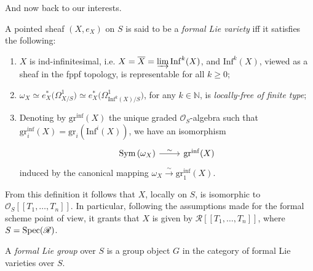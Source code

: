 \noindent
And now back to our interests.
\begin{defn}\label{defn:FormalLieVarfppf}
	A pointed sheaf $\left(X, e_X\right)$ on $S$ is said to be
	a \emph{formal Lie variety} iff it satisfies the following:
\begin{enumerate}
	\item $X$ is ind-infinitesimal,
		i.e$.$ \(X = \overline{X} = \varinjlim \operatorname{Inf}^k(X)\),
		and $\mathrm{Inf}^k(X)$, viewed as a sheaf in
		the fppf topology, is representable for all $k \geq 0$;

	\item $\omega_X \simeq
		e_X^* \big( \Omega_{X/S}^1 \big)
		\simeq e_X^* \big( \Omega^1_{\mathrm{Inf}^k(X)/S} \big)$, for any $k \in \mathbb{N}$,
		is \emph{locally-free of finite type};

	\item Denoting by $\mathrm{gr}^{\mathrm{inf}}(X)$ the unique graded $\mathcal{O}_{ S }$-algebra
		such that $\mathrm{gr}^{\mathrm{inf}}_i(X) = \mathrm{gr}_i(\mathrm{Inf}^i(X))$,
		we have an isomorphism
		\begin{equation*}
		\begin{tikzcd}[row sep = 0ex
			,/tikz/column 1/.append style={anchor=base east}
			,/tikz/column 2/.append style={anchor=base west}]
		\sym\left( \omega_X \right) \arrow[r, "\sim", rightarrow] &
				\mathrm{gr}^{\mathrm{inf}}(X)
		\end{tikzcd}
		\end{equation*}
		induced by the canonical mapping
		$\omega_X \xrightarrow{\sim} \mathrm{gr}_1^{\mathrm{inf}}(X)$.
\end{enumerate}
\end{defn}


\begin{rem}\label{rem:FormalLieVarietyPowerSeries}
	From this definition it follows that $X$, locally on $S$,
	is isomorphic to $\mathcal{O}_S [\![ T_1, \ldots, T_n ]\!]$.
	In particular, following the assumptions made for the formal scheme point of view,
	it grants that $X$ is given by
	$\mathscr{R} [\![ T_1, \ldots, T_n ]\!]$,
	where $S = \operatorname{Spec}(\mathscr{R})$.
\end{rem}


\begin{defn}
	A \emph{formal Lie group} over $S$ is a group object $G$
	in the category of formal Lie varieties over $S$.
\end{defn}


